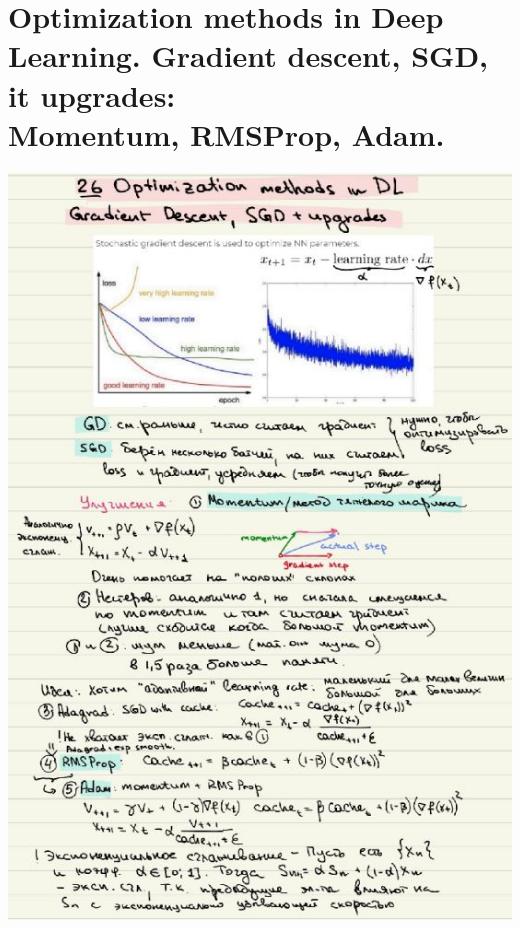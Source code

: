 \section{Optimization methods in Deep Learning. Gradient descent, SGD, it upgrades: \\ Momentum, RMSProp, Adam.}
\includegraphics[width=400pt]{images/26.JPG}
\newpage

